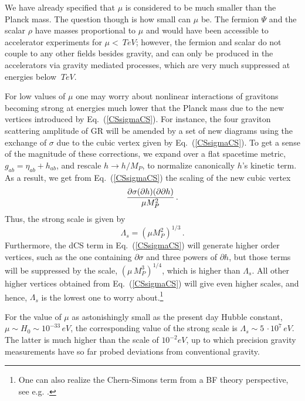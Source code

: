 \documentclass[prd,twocolumn,showpacs,superscriptaddress,nofootinbib]{revtex4-2}
\newcommand\be{\begin{equation}}
\newcommand\ee{\end{equation}}
\begin{document}
We have already specified that  $\mu$ is considered to be much smaller than the Planck mass. 
The question though is how small can $\mu$ be. The fermion $\Psi$ and the scalar $\rho$ have masses 
proportional to $\mu$ and would  have been  accessible to accelerator experiments for $\mu < ~TeV$; 
however,  the fermion and  scalar do not couple to any other fields besides  gravity, and 
can only be produced in the accelerators via gravity mediated processes, which are very much suppressed
at energies below  $~TeV$.

For low values of $\mu$ one may worry about  nonlinear interactions of gravitons  
becoming strong at energies much lower that the Planck mass due to the 
new vertices introduced by Eq.~(\ref {CSsigmaCS}). For instance, the four graviton scattering 
amplitude of GR will be amended  by a set of new diagrams using the exchange of 
$\sigma$  due to the cubic vertex given by Eq.~(\ref {CSsigmaCS}). To  get a sense of the 
magnitude of  these corrections, we expand over a flat spacetime metric, $g_{ab}=\eta_{ab}+h_{ab}$, 
and  rescale $h\to h/M_P$,  to normalize canonically $h$'s kinetic term.  As a result,  we get 
from Eq.~(\ref {CSsigmaCS}) the scaling of the new cubic vertex
 \be
{\partial \sigma (\partial h) (\partial \partial h) \over \mu M_P^2}\,.
\label{cubic}
\ee     
Thus, the strong scale  is given by 
\be
\Lambda_s = (\mu M_P^2)^{1/3}\,.
\label{strong}
\ee 
Furthermore, the dCS term in Eq.~(\ref {CSsigmaCS}) will generate
higher order vertices, such as the one containing $\partial\sigma$ and three powers of
$\partial h$, but those terms will be suppressed by the scale, $ (\mu \, M_P^3)^{1/4}$, which is
higher than $\Lambda_s$.  All other higher vertices obtained  from Eq.~(\ref {CSsigmaCS})  will give 
even higher scales, and hence, $\Lambda_s$ is the lowest one to worry about.\footnote{One can also realize the Chern-Simons term from a BF theory perspective, see e.g. \cite{Alexander:2005vb}.}


For the value of $\mu$ as astonishingly small  as the present day
Hubble constant, $\mu \sim H_0\sim 10^{-33}\, eV$, the corresponding value of the strong scale 
is $\Lambda_s \sim 5\,\cdot 10^{7}\, eV$. The latter  is much higher than the scale of 
$10^{-2} eV$, up to  which precision gravity measurements have so far probed deviations 
from conventional gravity.  
\end{document}
